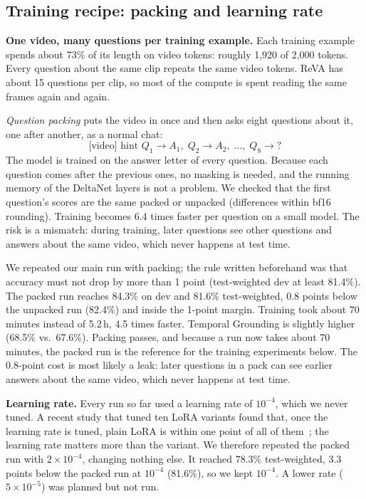 \subsection{Training recipe: packing and learning rate}
\label{sec:packing}
\textbf{One video, many questions per training example.}
Each training example spends about 73\% of its length on video tokens:
roughly 1,920 of 2,000 tokens. Every question about the same clip repeats
the same video tokens. ReVA has about 15 questions per clip, so most of the
compute is spent reading the same frames again and again.

\emph{Question packing} puts the video in once and then asks eight
questions about it, one after another, as a normal chat:
\[
\text{[video] hint } Q_1 \rightarrow A_1,\; Q_2 \rightarrow A_2,\; \ldots,\; Q_8 \rightarrow ?
\]
The model is trained on the answer letter of every question. Because each
question comes after the previous ones, no masking is needed, and the
running memory of the DeltaNet layers is not a problem. We checked that the
first question's scores are the same packed or unpacked (differences within
bf16 rounding). Training becomes 6.4 times faster per question on a small
model. The risk is a mismatch: during training, later questions see other
questions and answers about the same video, which never happens at test
time.

We repeated our main run with packing; the rule written beforehand was
that accuracy must not drop by more than 1 point (test-weighted dev at
least 81.4\%). The packed run reaches 84.3\% on dev and 81.6\% test-weighted, 0.8 points
below the unpacked run (82.4\%) and inside the 1-point margin. Training
took about 70 minutes instead of 5.2\,h, 4.5 times faster. Temporal
Grounding is slightly higher (68.5\% vs.\ 67.6\%). Packing passes, and
because a run now takes about 70 minutes, the packed run is the
reference for the training experiments below. The 0.8-point cost is most
likely a leak: later questions in a pack can see earlier answers about
the same video, which never happens at test time.

\textbf{Learning rate.} Every run so far used a learning rate of
$10^{-4}$, which we never tuned. A recent study that tuned ten LoRA
variants found that, once the learning rate is tuned, plain LoRA is within
one point of all of them~\cite{lee2026lrmatters}; the learning rate
matters more than the variant. We therefore repeated the packed run with
$2{\times}10^{-4}$, changing nothing else. It reached 78.3\% test-weighted,
3.3 points below the packed run at $10^{-4}$ (81.6\%), so we kept
$10^{-4}$. A lower rate ($5{\times}10^{-5}$) was planned but not run.


